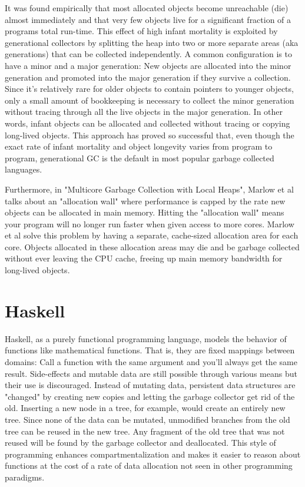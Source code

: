 \documentclass[a4paper,oneside]{memoir}
\begin{document}
It was found empirically that most allocated objects become unreachable (die)
almost immediately and that very few objects live for a significant fraction
of a programs total run-time.\cite{Courts:1988,Appel:1989} This effect of high infant mortality is exploited
by generational collectors by splitting the heap into two or more separate areas
(aka generations) that can be collected independently. A common configuration is
to have a minor and a major generation: New objects are allocated into the minor
generation and promoted into the major generation if they survive a collection.
Since it's relatively rare for older objects to contain pointers to younger
objects, only a small amount of bookkeeping is necessary to collect the minor
generation without tracing through all the live objects in the major generation.\cite{Appel:1989}
In other words, infant objects can be allocated and collected without tracing or
copying long-lived objects. This approach has proved so successful that, even
though the exact rate of infant mortality and object longevity varies from
program to program, generational GC is the default in most popular garbage
collected languages.

Furthermore, in "Multicore Garbage Collection with Local Heaps", Marlow et al talks
about an "allocation wall" where performance is capped by the rate new objects
can be allocated in main memory.\cite{Marlow:2011} Hitting the "allocation wall" means your
program will no longer run faster when given access to more cores. Marlow et al
solve this problem by having a separate, cache-sized allocation area for each core.
Objects allocated in these allocation areas may die and be garbage collected
without ever leaving the CPU cache, freeing up main memory bandwidth for
long-lived objects.

\section{Haskell}

Haskell, as a purely functional programming language, models the behavior of
functions like mathematical functions. That is, they are fixed mappings between
domains: Call a function with the same argument and you'll always get the same
result. Side-effects and mutable data are still possible through various means
but their use is discouraged. Instead of mutating data, persistent data structures
are "changed" by creating new copies and letting the garbage collector get rid of
the old. Inserting a new node in a tree, for example, would create an entirely
new tree. Since none of the data can be mutated, unmodified branches from the
old tree can be reused in the new tree. Any fragment of the old tree that was
not reused will be found by the garbage collector and deallocated. This style
of programming enhances compartmentalization and makes it easier to reason about
functions at the cost of a rate of data allocation not seen in other programming
paradigms.
\end{document}
